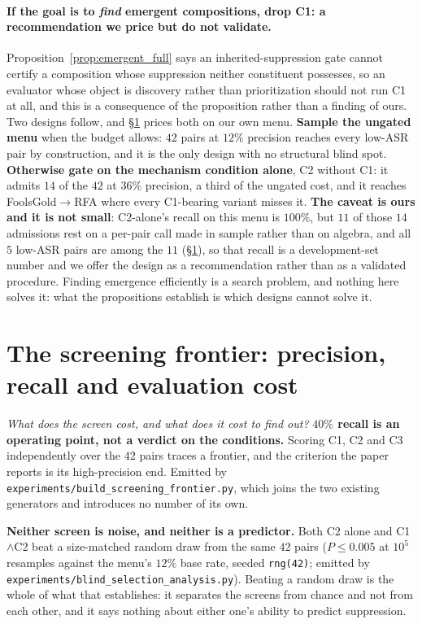 \documentclass{article}
\begin{document}
\paragraph{If the goal is to \emph{find} emergent compositions, drop C1: a recommendation we price but do not validate.} Proposition~\ref{prop:emergent_full} says an inherited-suppression gate cannot certify a composition whose suppression neither constituent possesses, so an evaluator whose object is discovery rather than prioritization should not run C1 at all, and this is a consequence of the proposition rather than a finding of ours. Two designs follow, and §\ref{app:frontier} prices both on our own menu. \textbf{Sample the ungated menu} when the budget allows: $42$ pairs at $12\%$ precision reaches every low-ASR pair by construction, and it is the only design with no structural blind spot. \textbf{Otherwise gate on the mechanism condition alone}, C2 without C1: it admits $14$ of the $42$ at $36\%$ precision, a third of the ungated cost, and it reaches FoolsGold$\to$RFA where every C1-bearing variant misses it. \textbf{The caveat is ours and it is not small}: C2-alone's recall on this menu is $100\%$, but $11$ of those $14$ admissions rest on a per-pair call made in sample rather than on algebra, and all $5$ low-ASR pairs are among the $11$ (§\ref{app:frontier}), so that recall is a development-set number and we offer the design as a recommendation rather than as a validated procedure. Finding emergence efficiently is a search problem, and nothing here solves it: what the propositions establish is which designs cannot solve it.

\section{The screening frontier: precision, recall and evaluation cost}
\label{app:frontier}

\noindent \emph{What does the screen cost, and what does it cost to find out?}
\textbf{$40\%$ recall is an operating point, not a verdict on the conditions.} Scoring C1, C2 and C3
independently over the $42$ pairs traces a frontier, and the criterion the paper reports is its
high-precision end. Emitted by \texttt{experiments/build\_screening\_frontier.py}, which joins the two
existing generators and introduces no number of its own.

\noindent \textbf{Neither screen is noise, and neither is a predictor.} Both C2 alone and C1$\wedge$C2 beat a size-matched random draw from the same $42$ pairs ($P \le 0.005$ at $10^5$ resamples against the menu's $12\%$ base rate, seeded \texttt{rng(42)}; emitted by \texttt{experiments/blind\_selection\_analysis.py}). Beating a random draw is the whole of what that establishes: it separates the screens from chance and not from each other, and it says nothing about either one's ability to predict suppression.
\end{document}
